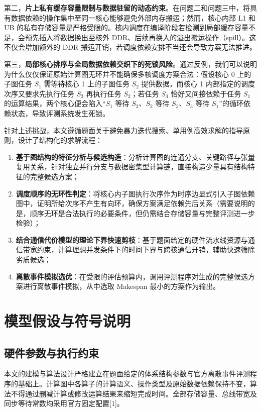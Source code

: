 \documentclass[anonymous,notoc]{gmcm2026}
\providecommand{\tightlist}{\setlength{\itemsep}{0pt}\setlength{\parskip}{0pt}}
\begin{document}
第二，\textbf{片上私有缓存容量限制与数据驻留的动态约束}。在问题二和问题三中，将具有数据依赖的操作集中至同一核心能够避免外部内存搬运；然而，核心内部 L1 和 UB 的私有存储容量是严格受限的。核内调度在编译阶段若检测到局部缓存容量不足，会预先插入将数据换出至核外 DDR、后续再换入的溢出搬运操作（spill）。这不仅会增加额外的 DDR 搬运开销，若调度依赖安排不当还会导致方案无法推进。

第三，\textbf{局部核心排序与全局数据依赖交织下的死锁风险}。通过反例，我们可以说明为什么仅仅保证原始计算图无环并不能确保多核调度方案合法：假设核心 0 上的子图任务 \(S_1\) 需等待核心 1 上的子图任务 \(S_2\) 提供数据，而核心 1 内部指定的调度次序又要求先执行任务 \(S_3\) 再执行任务 \(S_2\)；若任务 \(S_3\) 恰好又间接依赖于任务 \(S_1\) 的运算结果，两个核心便会陷入``\(S_1\) 等待 \(S_2\)、\(S_2\) 等待 \(S_3\)、\(S_3\) 等待 \(S_1\)''的循环依赖状态，导致评测系统发生死锁。

针对上述挑战，本文遵循题面关于避免暴力迭代搜索、单用例高效求解的指导原则，设计了结构化的求解流程：

\begin{enumerate}
\def\labelenumi{\arabic{enumi}.}
\tightlist
\item
  \textbf{基于图结构的特征分析与候选构造}：分析计算图的连通分支、关键路径与张量复用关系，针对独立并行分支与数据密集型计算链，直接构造少量具有结构特征的完整候选方案；
\item
  \textbf{调度顺序的无环性判定}：将核心内子图执行次序作为时序边显式引入子图依赖图中，证明所给次序不产生有向环，确保方案满足依赖先后关系（需要说明的是，顺序无环是合法执行的必要条件，但仍需结合存储容量与完整评测进一步检验）；
\item
  \textbf{结合通信代价模型的理论下界快速剪枝}：基于题面给定的硬件流水线资源与通信带宽约束，计算理想并发条件下的时间下界与跨核通信开销，辅助快速筛除劣质候选；
\item
  \textbf{离散事件模拟选优}：在受限的评估预算内，调用评测程序对生成的完整候选方案进行离散事件模拟，从中选取 Makespan 最小的方案作为输出。
\end{enumerate}


\section{模型假设与符号说明}

\subsection{硬件参数与执行约束}

本文的建模与算法设计严格建立在题面给定的体系结构参数与官方离散事件评测程序的基础上。计算图中各算子的计算语义、操作类型及原始数据依赖保持不变，算法不得通过删减计算或修改运算结果来缩短完成时间。全部存储容量、总线带宽及同步等待常数均采用官方固定配置{[}1{]}。
\end{document}
